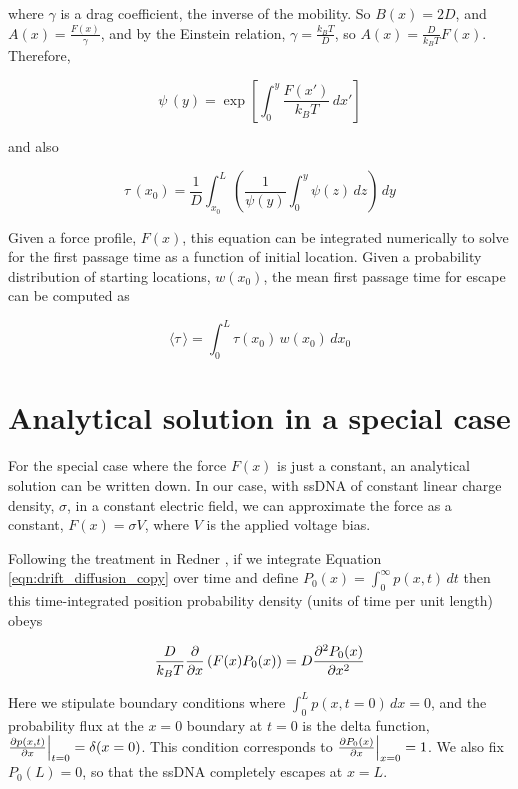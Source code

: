 \noindent
where $\gamma$ is a drag coefficient, the inverse of the mobility.  So $B(x) = 2D$, and $A(x) = \frac{F(x)}{\gamma}$, and by the Einstein relation, $\gamma = \frac{k_B T}{D}$, so $A(x) = \frac{D}{k_B T} F(x)$.  Therefore,

\begin{equation}
\psi \, (y) = \exp \left [ \int_0^y  \frac{F(x')}{k_B T} \,dx' \right ]
\label{eqn:psi2}
\end{equation}

and also

\begin{equation}
\tau \, (x_0) = \frac{1}{D} \int_{x_0}^{L} \left ( \frac{1}{\psi(y)} \int_{0}^{y} \psi(z) \,dz \right ) \,dy
\label{eqn:first_passage_sol}
\end{equation}

Given a force profile, $F(x)$, this equation can be integrated numerically to solve for the first passage time as a function of initial location.  Given a probability distribution of starting locations, $w(x_0)$, the mean first passage time for escape can be computed as

\begin{equation}
\langle \tau \, \rangle = \int_{0}^{L} \tau(x_0) \, w(x_0) \,dx_0
\label{eqn:mean_first_passage_sol}
\end{equation}

\section{Analytical solution in a special case}

For the special case where the force $F(x)$ is just a constant, an analytical solution can be written down.  In our case, with ssDNA of constant linear charge density, $\sigma$, in a constant electric field, we can approximate the force as a constant, $F(x) = \sigma V$, where $V$ is the applied voltage bias.

Following the treatment in Redner \citep{Redner2001}, if we integrate Equation \ref{eqn:drift_diffusion_copy} over time and define $P_0(x) = \int_{0}^{\infty} p(x,t) \,dt$ then this time-integrated position probability density (units of time per unit length) obeys

\begin{equation}
\frac{D}{k_B T} \frac{\partial }{\partial x} \left( F(x) P_0(x) \right) = D \frac{\partial^2 P_0(x)}{\partial x^2}
\label{eqn:biased_diffusion}
\end{equation}

Here we stipulate boundary conditions where $\int_{0}^{L} p(x,t=0) \,dx = 0$, and the probability flux at the $x=0$ boundary at $t=0$ is the delta function, $\frac{\partial p(x,t)}{\partial x} \Bigr|_{t=0} = \delta (x=0)$.  This condition corresponds to $\frac{\partial P_0(x)}{\partial x} \Bigr|_{x=0} = 1$.  We also fix $P_0(L)=0$, so that the ssDNA completely escapes at $x=L$.

